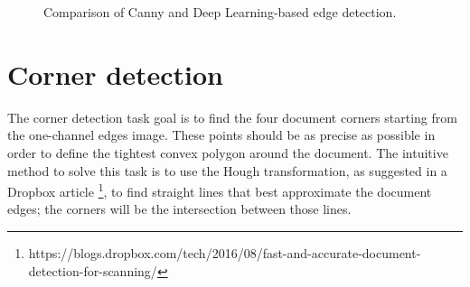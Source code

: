 \documentclass[a4paper]{article}
\begin{document}
\begin{figure}[!htbp]
	\centering

	\caption{Comparison of Canny and Deep Learning-based edge detection.}
	\label{fig:deep_comparison}
\end{figure}

\section{Corner detection}

The corner detection task goal is to find the four document corners starting from the one-channel edges image. These points should be as precise as possible in order to define the tightest convex polygon around the document. The intuitive method to solve this task is to use the Hough transformation, as suggested in a Dropbox article \footnote{https://blogs.dropbox.com/tech/2016/08/fast-and-accurate-document-detection-for-scanning/}, to find straight lines that best approximate the document edges; the corners will be the intersection between those lines.
\end{document}
